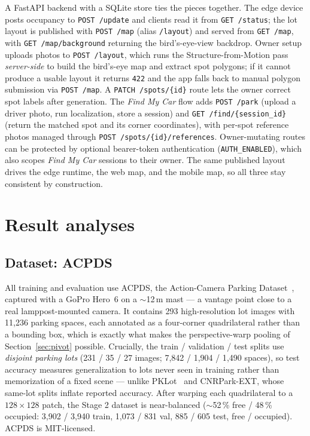\documentclass[10pt,twocolumn,letterpaper]{article}
\begin{document}
A FastAPI backend with a SQLite store ties the pieces together. The
edge device posts occupancy to \texttt{POST /update} and clients read it
from \texttt{GET /status}; the lot layout is published with
\texttt{POST /map} (alias \texttt{/layout}) and served from
\texttt{GET /map}, with \texttt{GET /map/background} returning the
bird's-eye-view backdrop. Owner setup uploads photos to
\texttt{POST /layout}, which runs the Structure-from-Motion pass
\emph{server-side} to build the bird's-eye map and extract spot polygons;
if it cannot produce a usable layout it returns \texttt{422} and the app
falls back to manual polygon submission via \texttt{POST /map}. A
\texttt{PATCH /spots/\{id\}} route lets the owner correct spot labels after
generation. The \emph{Find My Car} flow adds
\texttt{POST /park} (upload a driver photo, run localization, store a
session) and \texttt{GET /find/\{session\_id\}} (return the matched spot
and its corner coordinates), with per-spot reference photos managed through
\texttt{POST /spots/\{id\}/references}. Owner-mutating routes can be
protected by optional bearer-token authentication
(\texttt{AUTH\_ENABLED}), which also scopes \emph{Find My Car} sessions to
their owner. The same published layout drives the edge
runtime, the web map, and the mobile map, so all three stay consistent by
construction.

\section{Result analyses}
\label{sec:results-analyses}

\subsection{Dataset: ACPDS}
\label{sec:dataset}

All training and evaluation use ACPDS, the Action-Camera Parking
Dataset~\cite{marek2021imagebased}, captured with a GoPro Hero~6 on a
$\sim$12\,m mast --- a vantage point close to a real lamppost-mounted
camera. It contains 293 high-resolution lot images with 11{,}236 parking
spaces, each annotated as a four-corner quadrilateral rather than a
bounding box, which is exactly what makes the perspective-warp pooling of
Section~\ref{sec:pivot} possible. Crucially, the train / validation / test
splits use \emph{disjoint parking lots} (231 / 35 / 27 images;
7{,}842 / 1{,}904 / 1{,}490 spaces), so test accuracy measures
generalization to lots never seen in training rather than memorization of a
fixed scene --- unlike PKLot~\cite{almeida2015pklot} and CNRPark-EXT, whose
same-lot splits inflate reported accuracy. After warping each quadrilateral
to a $128\times128$ patch, the Stage 2 dataset is near-balanced
($\sim$52\,\% free / 48\,\% occupied: 3{,}902 / 3{,}940 train,
1{,}073 / 831 val, 885 / 605 test, free / occupied). ACPDS is MIT-licensed.
\end{document}
